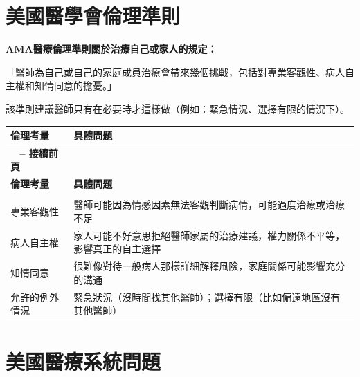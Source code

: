 \documentclass[12pt,a4paper]{article}
\begin{document}
\section{美國醫學會倫理準則}

\begin{importantbox}
\textbf{AMA醫療倫理準則關於治療自己或家人的規定：}

「醫師為自己或自己的家庭成員治療會帶來幾個挑戰，包括對專業客觀性、病人自主權和知情同意的擔憂。」

該準則建議醫師只有在必要時才這樣做（例如：緊急情況、選擇有限的情況下）。
\end{importantbox}

\begin{longtable}{>{\raggedright\arraybackslash}p{4cm} >{\raggedright\arraybackslash}p{11cm}}
\toprule
\textbf{\textcolor{emergency_red}{倫理考量}} & \textbf{\textcolor{emergency_red}{具體問題}} \\
\midrule
\endfirsthead

\multicolumn{2}{c}%
{{\bfseries \tablename\ \thetable{} -- 接續前頁}} \\
\toprule
\textbf{\textcolor{emergency_red}{倫理考量}} & \textbf{\textcolor{emergency_red}{具體問題}} \\
\midrule
\endhead

\midrule \multicolumn{2}{r}{{接續下頁}} \\ \midrule
\endfoot

\bottomrule
\endlastfoot

專業客觀性 & 醫師可能因為情感因素無法客觀判斷病情，可能過度治療或治療不足 \\

病人自主權 & 家人可能不好意思拒絕醫師家屬的治療建議，權力關係不平等，影響真正的自主選擇 \\

知情同意 & 很難像對待一般病人那樣詳細解釋風險，家庭關係可能影響充分的溝通 \\

允許的例外情況 & 緊急狀況（沒時間找其他醫師）；選擇有限（比如偏遠地區沒有其他醫師） \\
\end{longtable}

\section{美國醫療系統問題}
\end{document}
